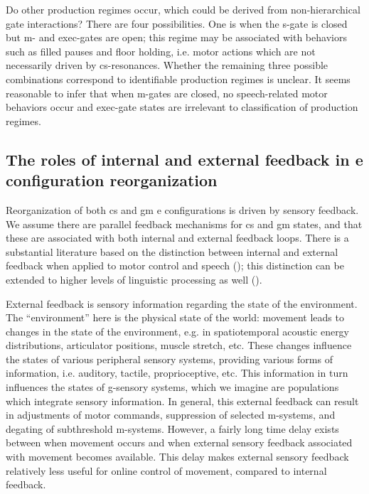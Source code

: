   Do other production regimes occur, which could  be derived from non-hierarchical gate interactions? There are four possibilities. One is when the s-gate is closed but m- and exec-gates are open; this regime may be associated with behaviors such as filled pauses and floor holding, i.e. motor actions which are not necessarily driven by cs-resonances. Whether the remaining three possible combinations correspond to identifiable production regimes is unclear. It seems reasonable to infer that when m-gates are closed, no speech-related motor behaviors occur and exec-gate states are irrelevant to classification of production regimes.

\subsection{The roles of internal and external feedback in e configuration reorganization}

Reorganization of both cs and gm e configurations is driven by sensory feedback. We assume there are parallel feedback mechanisms for cs and gm states, and that these are associated with both internal and external feedback loops. There is a substantial literature based on the distinction between internal and external feedback when applied to motor control and speech (\citealt{Hickok2012,Kawato1999,MiallWolpert1996,RamanarayananEtAl2016,WolpertEtAl1995,WolpertKawato1998}); this distinction can be extended to higher levels of linguistic processing as well (\citealt{HagoortLevelt2009,Laver1973,Levelt1983,Levelt1989,Nooteboom1973,NooteboomQuené2008,Postma2000}).

  External feedback is sensory information regarding the state of the environment. The “environment” here is the physical state of the world: movement leads to changes in the state of the environment, e.g. in spatiotemporal acoustic energy distributions, articulator positions, muscle stretch, etc. These changes influence the states of various peripheral sensory systems, providing various forms of information, i.e. auditory, tactile, proprioceptive, etc. This information in turn influences the states of g-sensory systems, which we imagine are populations which integrate sensory information. In general, this external feedback can result in adjustments of motor commands, suppression of selected m-systems, and degating of subthreshold m-systems. However, a fairly long time delay exists between when movement occurs and when external sensory feedback associated with movement becomes available. This delay makes external sensory feedback relatively less useful for online control of movement, compared to internal feedback. 


